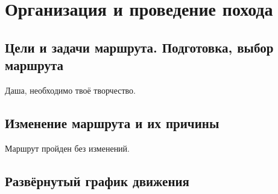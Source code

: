 \section{Организация и проведение похода}
\subsection{Цели и задачи маршрута. Подготовка, выбор маршрута}
Даша, необходимо твоё творчество.

\subsection{Изменение маршрута и их причины}
Маршрут пройден без изменений.
\subsection{Развёрнутый график движения}
